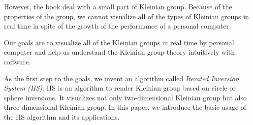 However, the book deal with a small part of Kleinian group.
Because of the properties of the group, we cannot
visualize all of the types of Kleinian groups in real time
in spite of the growth of the performance of a personal computer.

Our goals are to visualize all of the Kleinian groups in real time by
personal computer and help us understand the Kleinian group theory
intuitively with software.

As the first step to the goals, we invent an algorithm called
\textit{Iterated Inversion System (IIS)}.
IIS is an algorithm to render Kleinian group based on circle or sphere
inversions.
It visualizes not only two-dimensional Kleinian group but also
three-dimensional Kleinian group.
In this paper, we introduce the basic usage of the IIS algorithm and its
applications.

